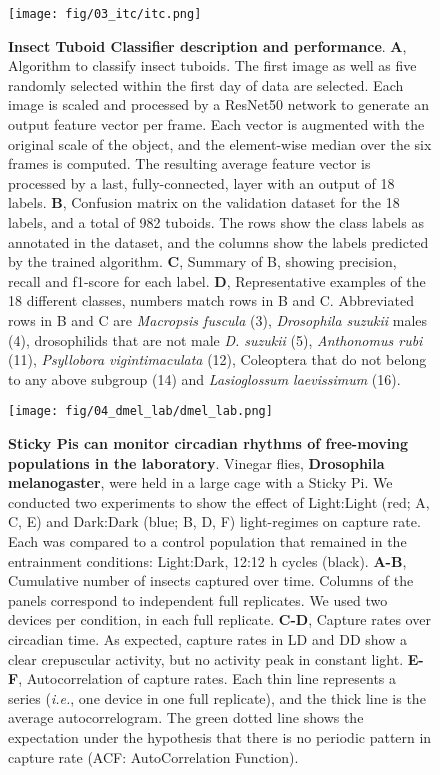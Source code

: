\documentclass[12pt]{article}
\begin{document}
	\begin{figure}[ht]
		\centering
		\texttt{[image: fig/03\_itc/itc.png]}
		\caption{\textbf{Insect Tuboid Classifier description and performance}. \textbf{A}, Algorithm to classify insect tuboids. The first image as well as five randomly selected within the first day of data are selected. Each image is scaled and processed by a ResNet50 network to generate an output feature vector per frame. Each vector is augmented with the original scale of the object, and the element-wise median over the six frames is computed. The resulting average feature vector is processed by a last, fully-connected, layer with an output of 18 labels. \textbf{B}, Confusion matrix on the validation dataset for the 18 labels, and a total of 982 tuboids. The rows show the class labels as annotated in the dataset, and the columns show the labels predicted by the trained algorithm. \textbf{C}, Summary of B, showing precision, recall and f1-score for each label. \textbf{D}, Representative examples of the 18 different classes, numbers match rows in B and C. Abbreviated rows in B and C are \emph{Macropsis fuscula} (3), \emph{Drosophila suzukii} males (4), drosophilids that are not male \emph{D. suzukii} (5), \emph{Anthonomus rubi} (11), \emph{Psyllobora vigintimaculata} (12), Coleoptera that do not belong to any above subgroup (14) and \emph{Lasioglossum laevissimum} (16).}
		\label{fig:03}
	\end{figure}

	\pagebreak

	\begin{figure}[ht]
		\centering
		\texttt{[image: fig/04\_dmel\_lab/dmel\_lab.png]}
		\caption{\textbf{Sticky Pis can monitor circadian rhythms of free-moving populations in the laboratory}. Vinegar flies, \textbf{Drosophila melanogaster}, were held in a large cage with a Sticky Pi. We conducted two experiments to show the effect of Light:Light (red; A, C, E) and Dark:Dark (blue; B, D, F) light-regimes on capture rate. Each was compared to a control population that remained in the entrainment conditions: Light:Dark, 12:12 h cycles (black). \textbf{A-B}, Cumulative number of insects captured over time. Columns of the panels correspond to independent full replicates. We used two devices per condition, in each full replicate. \textbf{C-D}, Capture rates over circadian time. As expected, capture rates in LD and DD show a clear crepuscular activity, but no activity peak in constant light. \textbf{E-F}, Autocorrelation of capture rates. Each thin line represents a series (\emph{i.e.}, one device in one full replicate), and the thick line is the average autocorrelogram. The green dotted line shows the expectation under the hypothesis that there is no periodic pattern in capture rate (ACF: AutoCorrelation Function).
		}
		\label{fig:04}
	\end{figure}
\end{document}
